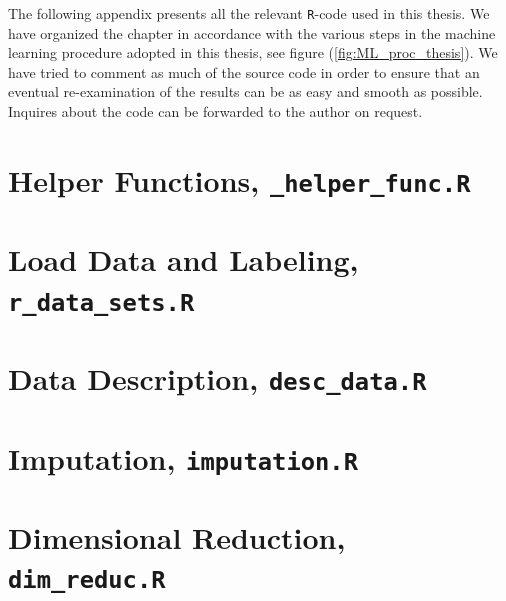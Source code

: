 \documentclass[../thesis.tex]{subfiles}
\begin{document}
\noindent The following appendix presents all the relevant \texttt{R}-code used in this thesis. We have organized the chapter in accordance with the various steps in the machine learning procedure adopted in this thesis, see figure (\ref{fig:ML_proc_thesis}). We have tried to comment as much of the source code in order to ensure that an eventual re-examination of the results can be as easy and smooth as possible. Inquires about the code can be forwarded to the author on request.

\section{Helper Functions, \texttt{\_helper\_func.R}}
\label{sec:helper_func}



\section{Load Data and Labeling, \texttt{r\_data\_sets.R}}
\label{sec:load_data}



\section{Data Description, \texttt{desc\_data.R}}
\label{sec:app_desc_stat}



\section{Imputation, \texttt{imputation.R}}
\label{sec:app_impu}



\section{Dimensional Reduction, \texttt{dim\_reduc.R}}
\label{sec:dim_red}
\end{document}
